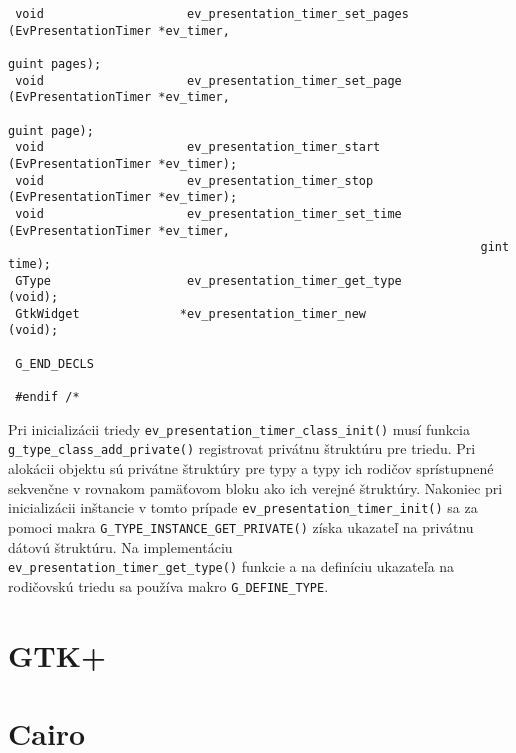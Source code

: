\documentclass[12pt,oneside,final]{fithesis2}
\begin{document}
\begin{tiny}
\begin{verbatim}
 void                    ev_presentation_timer_set_pages         (EvPresentationTimer *ev_timer,
                                                                  guint pages);
 void                    ev_presentation_timer_set_page          (EvPresentationTimer *ev_timer,
                                                                  guint page);
 void                    ev_presentation_timer_start             (EvPresentationTimer *ev_timer);
 void                    ev_presentation_timer_stop              (EvPresentationTimer *ev_timer);
 void                    ev_presentation_timer_set_time          (EvPresentationTimer *ev_timer,
                                                                  gint time);
 GType                   ev_presentation_timer_get_type          (void);
 GtkWidget              *ev_presentation_timer_new               (void);
 
 G_END_DECLS
 
 #endif /*
\end{verbatim}
\end{tiny} %
Pri inicializácii triedy \verb|ev_presentation_timer_class_init()| musí funkcia \verb|g_type_class_add_private()| registrovat privátnu štruktúru pre triedu. Pri alokácii objektu sú privátne štruktúry pre typy a typy ich rodičov sprístupnené sekvenčne v rovnakom pamäťovom bloku ako ich verejné štruktúry. Nakoniec pri inicializácii inštancie v tomto prípade \verb|ev_presentation_timer_init()| sa za pomoci makra \verb|G_TYPE_INSTANCE_GET_PRIVATE()| získa ukazateľ na privátnu dátovú štruktúru. Na implementáciu \\
\verb|ev_presentation_timer_get_type()| funkcie a na definíciu ukazateľa na rodičovskú triedu sa používa makro \verb|G_DEFINE_TYPE|.

\section{GTK+}
\section{Cairo}

\end{document}
